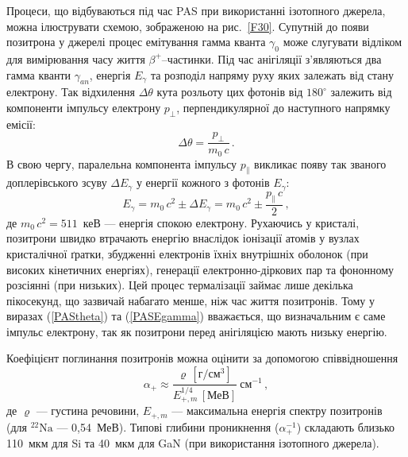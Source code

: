 \documentclass[10pt,a5paper,titlepage,oneside]{book}
\numberwithin{equation}{part}
\begin{document}
Процеси, що відбуваються під час PAS при використанні ізотопного джерела, можна ілюструвати схемою,
зображеною на рис.~\ref{F30}.
Супутній до появи позитрона у джерелі процес емітування гамма кванта $\gamma_0$ може слугувати
відліком для вимірювання часу життя $\beta^+$--частинки.
Під час анігіляції з'являються два гамма кванти $\gamma_{an}$, енергія $E_\gamma$
та розподіл напряму руху яких залежать від стану електрону.
Так відхилення $\Delta\theta$ кута розльоту цих фотонів
від $180^\circ$ залежить від компоненти імпульсу електрону $p_\perp$, перпендикулярної до наступного
напрямку емісії:
\begin{equation}\label{PAStheta}
\Delta\theta=\frac{p_\perp}{m_0\,c}\,.
\end{equation}
В свою чергу, паралельна компонента імпульсу $p_\parallel$ викликає появу
так званого доплерівського зсуву $\Delta E_\gamma$ у енергії кожного з фотонів $E_\gamma$:
\begin{equation}\label{PASEgamma}
E_\gamma=m_0\,c^2\pm\Delta E_\gamma=m_0\,c^2\pm\frac{p_\parallel \,c}{2}\,,
\end{equation}
де
$m_0\,c^2=511$~кеВ --- енергія спокою електрону.
Рухаючись у кристалі,  позитрони швидко втрачають енергію внаслідок
іонізації атомів у вузлах кристалічної ґратки, збудженні електронів їхніх
внутрішніх оболонок (при високих кінетичних енергіях), генерації електронно-діркових пар та
фононному розсіянні (при низьких).
Цей процес термалізації займає лише декілька пікосекунд, що зазвичай набагато менше, ніж час життя позитронів.
Тому у виразах (\ref{PAStheta}) та (\ref{PASEgamma}) вважається, що визначальним
є саме імпульс електрону, так як позитрони перед анігіляцією мають низьку енергію.



Коефіцієнт поглинання позитронів можна оцінити за допомогою співвідношення \cite{PAS}
\begin{equation}
\alpha_+\approx\frac{\varrho\,\left[\text{г}/\text{см}^3\right]}{E_{+,m}^{1/4}\,[\text{МеВ}]}\:\text{см}^{-1}\,,
\end{equation}
де
$\varrho$ --- густина речовини,
$E_{+,m}$ --- максимальна енергія спектру позитронів (для $^{22}\text{Na}$ --- 0,54~МеВ).
Типові глибини проникнення ($\alpha^{-1}_+$) складають близько 110~мкм для Si та 40~мкм для GaN (при використання ізотопного джерела).
\end{document}
